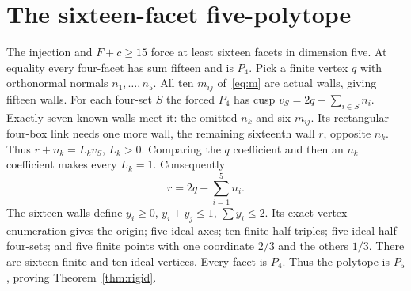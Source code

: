 \documentclass[11pt]{article}
\begin{document}
\section{The sixteen-facet five-polytope}\label{sec:p5}
The injection and $F+c\ge15$ force at least sixteen facets in dimension
five. At equality every four-facet has sum fifteen and is $P_4$.
Pick a finite vertex $q$ with orthonormal normals $n_1,\ldots,n_5$.
All ten $m_{ij}$ of~\eqref{eq:m} are actual walls, giving fifteen walls.
For each four-set $S$ the forced $P_4$ has cusp
$v_S=2q-\sum_{i\in S}n_i$. Exactly seven known walls meet it: the
omitted $n_k$ and six $m_{ij}$. Its rectangular four-box link needs
one more wall, the remaining sixteenth wall $r$, opposite $n_k$.
Thus $r+n_k=L_kv_S$, $L_k>0$. Comparing the $q$ coefficient and then
an $n_k$ coefficient makes every $L_k=1$. Consequently
\[
 r=2q-\sum_{i=1}^5n_i.
\]
The sixteen walls define $y_i\ge0$, $y_i+y_j\le1$, $\sum y_i\le2$.
Its exact vertex enumeration gives the origin; five ideal axes; ten
finite half-triples; five ideal half-four-sets; and five finite points
with one coordinate $2/3$ and the others $1/3$.
There are sixteen finite and ten ideal vertices. Every facet is $P_4$.
Thus the polytope is $P_5$, proving Theorem~\ref{thm:rigid}.
\end{document}

